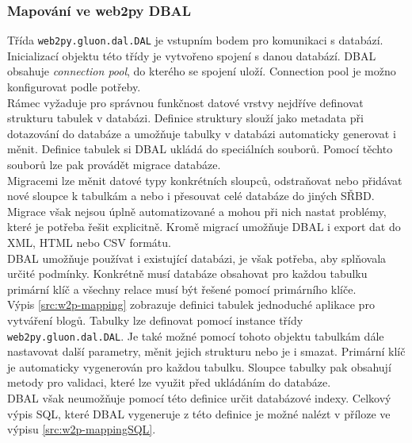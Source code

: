 \documentclass[ing,male,java,dept456]{diploma}						%
\begin{document}
\subsubsection{Mapování ve web2py DBAL}
Třída \lstinline[style=inlinepython]|web2py.gluon.dal.DAL| je vstupním bodem pro komunikaci s databází. Inicializací objektu této třídy je vytvořeno spojení s danou databází. DBAL obsahuje \textit{connection pool}, do kterého se spojení uloží. Connection pool je možno konfigurovat podle potřeby. \\
Rámec vyžaduje pro správnou funkčnost datové vrstvy nejdříve definovat strukturu tabulek v databázi. Definice struktury slouží jako metadata při dotazování do databáze a umožňuje tabulky v databázi automaticky generovat i měnit. Definice tabulek si DBAL ukládá do speciálních souborů. Pomocí těchto souborů lze pak provádět migrace databáze. \\
Migracemi lze měnit datové typy konkrétních sloupců, odstraňovat nebo přidávat nové sloupce k tabulkám a nebo i přesouvat celé databáze do jiných SŘBD. Migrace však nejsou úplně automatizované a mohou při nich nastat problémy, které je potřeba řešit explicitně. Kromě migrací umožňuje DBAL i export dat do XML, HTML nebo CSV formátu. \\
DBAL umožňuje používat i existující databázi, je však potřeba, aby splňovala určité podmínky. Konkrétně musí databáze obsahovat pro každou tabulku primární klíč a všechny relace musí být řešené pomocí primárního klíče. \\
Výpis \ref{src:w2p-mapping} zobrazuje definici tabulek jednoduché aplikace pro vytváření blogů. Tabulky lze definovat pomocí instance třídy \lstinline[style=inlinepython]|web2py.gluon.dal.DAL|. Je také možné pomocí tohoto objektu tabulkám dále nastavovat další parametry, měnit jejich strukturu nebo je i smazat. Primární klíč je automaticky vygenerován pro každou tabulku. Sloupce tabulky pak obsahují metody pro validaci, které lze využit před ukládáním do databáze. \\
DBAL však neumožňuje pomocí této definice určit databázové indexy. Celkový výpis SQL, které DBAL vygeneruje z této definice je možné nalézt v příloze ve výpisu \ref{src:w2p-mappingSQL}.
\end{document}
